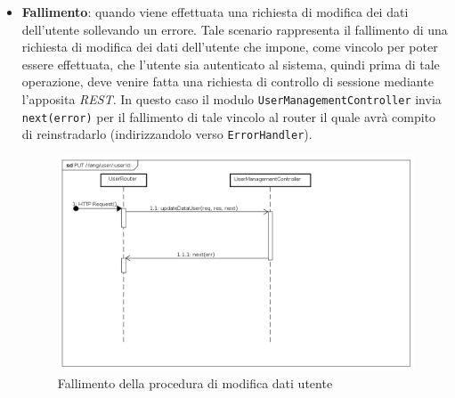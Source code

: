 \begin{itemize}
\item \textbf{Fallimento}: quando viene effettuata una richiesta di modifica dei dati dell'utente sollevando un errore. Tale scenario rappresenta il fallimento di una richiesta di modifica dei dati dell'utente che impone, come vincolo per poter essere effettuata, che l'utente sia autenticato al sistema, quindi prima di tale operazione, deve venire fatta una richiesta di controllo di sessione mediante l'apposita \textit{REST}. In questo caso il modulo \texttt{UserManagementController} invia \texttt{next(error)} per il fallimento di tale vincolo al router il quale avrà compito di reinstradarlo (indirizzandolo verso \texttt{ErrorHandler}).
\label{Fallimento della procedura di modifica dati utente}
\begin{figure}[ht]
	\centering
	\includegraphics[scale=0.40]{UML/DiagrammiDiSequenza/Back-end/PUT_LangUserUseridFailure.png}
	
	\caption{Fallimento della procedura di modifica dati utente}
\end{figure}
\FloatBarrier
\end{itemize}

